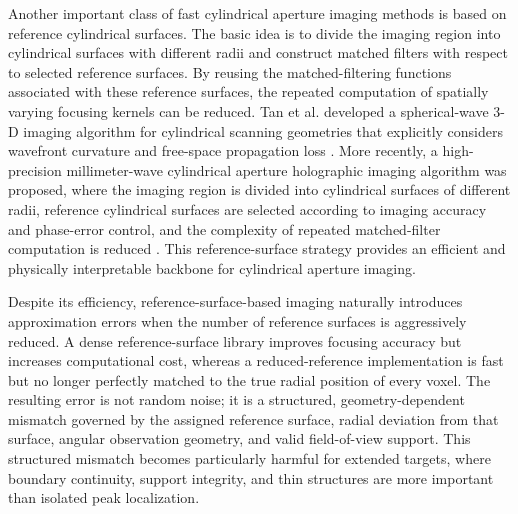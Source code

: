 \documentclass[journal]{IEEEtran}
\begin{document}
Another important class of fast cylindrical aperture imaging methods is based on reference cylindrical surfaces. The basic idea is to divide the imaging region into cylindrical surfaces with different radii and construct matched filters with respect to selected reference surfaces. By reusing the matched-filtering functions associated with these reference surfaces, the repeated computation of spatially varying focusing kernels can be reduced. Tan et al. developed a spherical-wave 3-D imaging algorithm for cylindrical scanning geometries that explicitly considers wavefront curvature and free-space propagation loss \cite{Tan_Hong_Wang_Wu_2011}. More recently, a high-precision millimeter-wave cylindrical aperture holographic imaging algorithm was proposed, where the imaging region is divided into cylindrical surfaces of different radii, reference cylindrical surfaces are selected according to imaging accuracy and phase-error control, and the complexity of repeated matched-filter computation is reduced \cite{Tan}. This reference-surface strategy provides an efficient and physically interpretable backbone for cylindrical aperture imaging.

Despite its efficiency, reference-surface-based imaging naturally introduces approximation errors when the number of reference surfaces is aggressively reduced. A dense reference-surface library improves focusing accuracy but increases computational cost, whereas a reduced-reference implementation is fast but no longer perfectly matched to the true radial position of every voxel. The resulting error is not random noise; it is a structured, geometry-dependent mismatch governed by the assigned reference surface, radial deviation from that surface, angular observation geometry, and valid field-of-view support. This structured mismatch becomes particularly harmful for extended targets, where boundary continuity, support integrity, and thin structures are more important than isolated peak localization.
\end{document}
